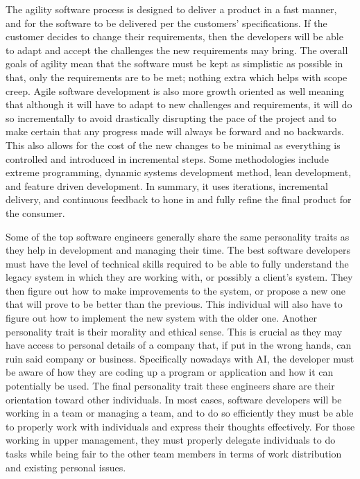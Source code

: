 	The agility software process is designed to deliver a product in a fast manner, and for the software to be delivered per the customers' specifications. If the customer decides to change their requirements, then the developers will be able to adapt and accept the challenges the new requirements may bring. The overall goals of agility mean that the software must be kept as simplistic as possible in that, only the requirements are to be met; nothing extra which helps with scope creep. Agile software development is also more growth oriented as well meaning that although it will have to adapt to new challenges and requirements, it will do so incrementally to avoid drastically disrupting the pace of the project and to make certain that any progress made will always be forward and no backwards. This also allows for the cost of the new changes to be minimal as everything is controlled and introduced in incremental steps. Some methodologies include extreme programming, dynamic systems development method, lean development, and feature driven development. In summary, it uses iterations, incremental delivery, and continuous feedback to hone in and fully refine the final product for the consumer.


\newpage
	Some of the top software engineers generally share the same personality traits as they help in development and managing their time. The best software developers must have the level of technical skills required to be able to fully understand the legacy system in which they are working with, or possibly a client's system. They then figure out how to make improvements to the system, or propose a new one that will prove to be better than the previous. This individual will also have to figure out how to implement the new system with the older one. Another personality trait is their morality and ethical sense. This is crucial as they may have access to personal details of a company that, if put in the wrong hands, can ruin said company or business. Specifically nowadays with AI, the developer must be aware of how they are coding up a program or application and how it can potentially be used. The final personality trait these engineers share are their orientation toward other individuals. In most cases, software developers will be working in a team or managing a team, and to do so efficiently they must be able to properly work with individuals and express their thoughts effectively. For those working in upper management, they must properly delegate individuals to do tasks while being fair to the other team members in terms of work distribution and existing personal issues.


